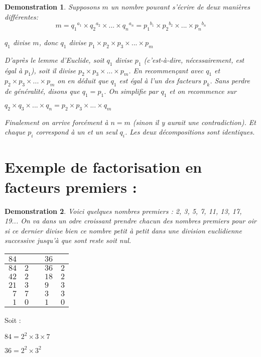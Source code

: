 \documentclass[titlepage]{article}
\newtheorem{dem}{Demonstration}
\begin{document}
\begin{dem}
Supposons $m$ un nombre pouvant s'écrire de deux manières différentes: 
	\begin{equation*}
		m = {q_{1}}^{a_{1}}\times {q_{2}}^{a_{2}}\times ...
		\times {q_{n}}^{a_{n}} = {p_{1}}^{b_{1}}\times {p_{2}}^{b_{2}}
		\times ...\times {p_{n}}^{b_{n}}
	\end{equation*}

$q_{1}$ divise $m$, donc $q_{1}$ divise $p_{1} \times p_{2} \times p_{3} \times 
... \times p_{m}$ \par \medskip
D'après le lemme d'Euclide, soit $q_{1}$ divise $p_{1}$ (c'est-à-dire, 
nécessairement, est égal à $p_{1}$), soit il divise $p_{2} \times p_{3} \times 
... \times p_{m}$. En recommençant avec $q_{1}$ et $p_{2} \times p_{3} \times ... 
\times p_{m}$ on en déduit que $q_{1}$ est égal à l'un des facteurs $p_{k}$. Sans perdre de généralité, disons que $q_{1} = p_{1}$. On simplifie par $q_{1}$ et on recommence sur

$q_{2} \times q_{3} \times ... \times q_{n} = p_{2} \times p_{3} \times ... 
\times q_{m}$\bigskip

Finalement on arrive forcément à $n = m$ (sinon il y aurait une contradiction). 
Et chaque $p_{i}$ correspond à un et un seul $q_{i}$. Les deux décompositions sont identiques.
\end{dem}

\section{Exemple de factorisation en facteurs premiers :}
\begin{dem}
Voici quelques nombres premiers : 2, 3, 5, 7, 11, 13, 17, 19...
On va dans un odre croissant prendre chacun des nombres premiers pour oir si ce 
dernier divise bien ce nombre petit à petit dans une division euclidienne 
successive jusqu'à que sont reste soit nul.\par
\begin{tabular}{r|r c l|l}
$84$ &  &  & $36$& \\
\hline
$84$ & $2 $&   &$ 36 $&$ 2$\\
$42 $& $2 $&   & $18 $& $2$\\
$21$ & $3 $&   & $9 $& $3$\\
$7 $& $7 $&   & $3 $& $3$\\
$1$ & $0$ &   & $1$ & $0$\\
\end{tabular}
\end{dem}
Soit : \par
$84 = 2^{2} \times 3 \times 7 $\par
$36 = 2^{2} \times 3^{2}$
\end{document}
